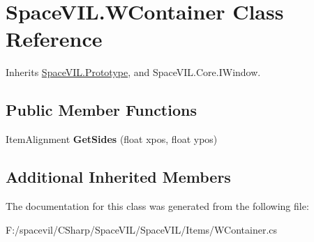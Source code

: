 \hypertarget{class_space_v_i_l_1_1_w_container}{}\section{Space\+V\+I\+L.\+W\+Container Class Reference}
\label{class_space_v_i_l_1_1_w_container}


Inherits \mbox{\hyperlink{class_space_v_i_l_1_1_prototype}{Space\+V\+I\+L.\+Prototype}}, and Space\+V\+I\+L.\+Core.\+I\+Window.

\subsection*{Public Member Functions}
\begin{DoxyCompactItemize}
\item 
\mbox{\label{class_space_v_i_l_1_1_w_container_ac1f0ab7e9f515147a1aa62d8bc0de897}} 
Item\+Alignment {\bfseries Get\+Sides} (float xpos, float ypos)
\end{DoxyCompactItemize}
\subsection*{Additional Inherited Members}


The documentation for this class was generated from the following file\+:\begin{DoxyCompactItemize}
\item 
F\+:/spacevil/\+C\+Sharp/\+Space\+V\+I\+L/\+Space\+V\+I\+L/\+Items/W\+Container.\+cs\end{DoxyCompactItemize}
